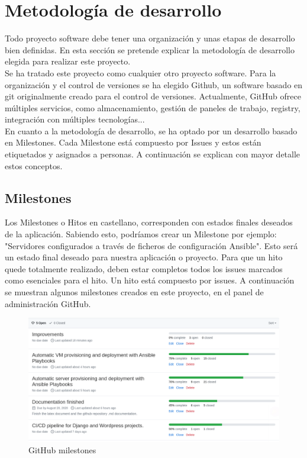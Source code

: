 \section{Metodología de desarrollo}
	\begin{paragraph}
		Todo proyecto software debe tener una organización y unas etapas de desarrollo bien definidas. En esta sección se pretende explicar la metodología de desarrollo elegida para realizar este proyecto. \\
		Se ha tratado este proyecto como cualquier otro proyecto software. Para la organización y el control de versiones se ha elegido Github, un software basado en git originalmente creado para el control de versiones. Actualmente, GitHub ofrece múltiples servicios, como almacenamiento, gestión de paneles de trabajo, registry, integración con múltiples tecnologías... \\
		En cuanto a la metodología de desarrollo, se ha optado por un desarrollo basado en Milestones. Cada Milestone está compuesto por Issues y estos están etiquetados y asignados a personas. A continuación se explican con mayor detalle estos conceptos.
	\end{paragraph}

	\subsection{Milestones}
	\label{milestones}
	\begin{paragraph}
		Los Milestones o Hitos en castellano, corresponden con estados finales deseados de la aplicación. Sabiendo esto, podríamos crear un Milestone por ejemplo: "Servidores configurados a través de ficheros de configuración Ansible". Esto será un estado final deseado para nuestra aplicación o proyecto. Para que un hito quede totalmente realizado, deben estar completos todos los issues marcados como esenciales para el hito. Un hito está compuesto por issues. A continuación se muestran algunos milestones creados en este proyecto, en el panel de administración GitHub.
		
		\begin{figure}[!hbt]
			\centering
			\includegraphics[scale=0.37]{imagenes/Analisis/milestones.png}
			\caption[GitHub milestones]{GitHub milestones}
			\label{github_milestones}
		\end{figure}
	\end{paragraph}
